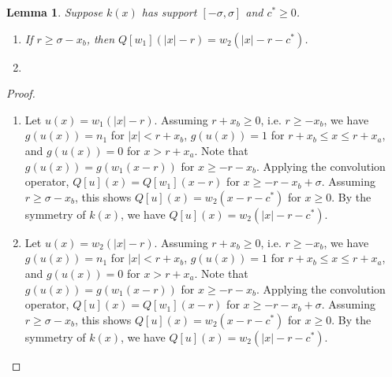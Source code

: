 \documentclass[11pt]{article}
\newtheorem{lem}[thm]{Lemma}
\theoremstyle{definition}
\numberwithin{equation}{section}
\numberwithin{thm}{section}
\renewcommand{\a}{a}
\renewcommand{\b}{b}
\newcommand{\m}{n_1}
\begin{document}
%



\begin{lem}
Suppose $k(x)$ has support $[-\sigma,\sigma]$ and $c^*\geq0$.

\begin{enumerate}
\item If $r \geq \sigma - x_\b$, then $Q[w_1](|x|-r) = w_2(|x|-r-c^*)$.

\item 
\end{enumerate}
\end{lem}

\begin{proof}
\begin{enumerate}
\item 
Let $u(x) = w_1(|x|-r)$. Assuming $r+x_\b \geq 0$, i.e. $r \geq -x_\b$, we have $g(u(x)) = \m$ for $|x| < r+x_\b$, $g(u(x)) = 1$ for $r+x_\b \leq x \leq r+x_\a$, and $g(u(x)) = 0 $ for $x > r+x_\a$. Note that $g(u(x)) = g(w_1(x-r))$ for $x \geq -r-x_\b$. Applying the convolution operator, $Q[u](x) = Q[w_1](x-r)$ for $x \geq -r-x_\b+\sigma$. Assuming $r \geq \sigma - x_\b$, this shows $Q[u](x) = w_2(x-r-c^*)$ for $x \geq 0$. By the symmetry of $k(x)$, we have $Q[u](x) = w_2(|x|-r-c^*)$.

\item 
Let $u(x) = w_2(|x|-r)$. Assuming $r+x_\b \geq 0$, i.e. $r \geq -x_\b$, we have $g(u(x)) = \m$ for $|x| < r+x_\b$, $g(u(x)) = 1$ for $r+x_\b \leq x \leq r+x_\a$, and $g(u(x)) = 0 $ for $x > r+x_\a$. Note that $g(u(x)) = g(w_1(x-r))$ for $x \geq -r-x_\b$. Applying the convolution operator, $Q[u](x) = Q[w_1](x-r)$ for $x \geq -r-x_\b+\sigma$. Assuming $r \geq \sigma - x_\b$, this shows $Q[u](x) = w_2(x-r-c^*)$ for $x \geq 0$. By the symmetry of $k(x)$, we have $Q[u](x) = w_2(|x|-r-c^*)$.
\end{enumerate}
\end{proof}
\end{document}
